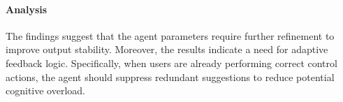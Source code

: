 \paragraph{Analysis}

The findings suggest that the agent parameters require further refinement to improve output stability. Moreover, the results indicate a need for adaptive feedback logic. Specifically, when users are already performing correct control actions, the agent should suppress redundant suggestions to reduce potential cognitive overload.